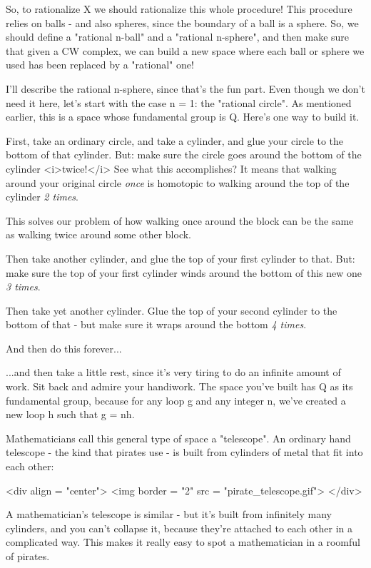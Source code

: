 So, to rationalize X we should rationalize this whole procedure!  This
procedure relies on balls - and also spheres, since the boundary of a
ball is a sphere.  So, we should define a "rational n-ball"
and a "rational n-sphere", and then make sure that given a
CW complex, we can build a new space where each ball or sphere we used
has been replaced by a "rational" one!

I'll describe the rational n-sphere, since that's the fun part.
Even though we don't need it here, let's start with the case n = 1:
the "rational circle".  As mentioned earlier, this is a space whose 
fundamental group is Q.  Here's one way to build it.  

First, take an ordinary circle, and take a cylinder, and glue your
circle to the bottom of that cylinder.  But: make sure the 
circle goes around the bottom of the cylinder <i>twice!</i> See what
this accomplishes?  It means that walking around your original circle
\emph{once} is homotopic to walking around the top of the cylinder
\emph{2 times}.

This solves our problem of how walking once around the block can be
the same as walking twice around some other block.

Then take another cylinder, and glue the top of your first cylinder 
to that.  But: make sure the top of your first cylinder winds around 
the bottom of this new one \emph{3 times}.  

Then take yet another cylinder.   Glue the top of your second
cylinder to the bottom of that - but make sure it wraps around
the bottom \emph{4 times}.  

And then do this forever... 

...and then take a little rest, since it's
very tiring to do an infinite amount of work.  Sit back and admire
your handiwork.  
The space you've built has Q as its fundamental
group, because for any loop g and any integer n, we've created a new
loop h such that g = nh.

Mathematicians call this general type of space a "telescope".
An ordinary hand telescope - the kind that pirates use - is built 
from cylinders of metal that fit into each other:

<div align = "center">
<img border = "2" src = "pirate_telescope.gif">
</div>

A mathematician's telescope is similar - but it's built from infinitely
many cylinders, and you can't collapse it, because they're attached to
each other in a complicated way.  This makes it really easy to spot a
mathematician in a roomful of pirates.

